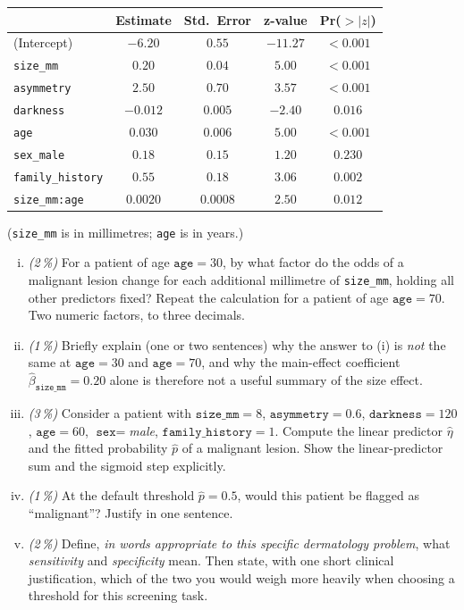 \documentclass[11pt,a4paper]{article}
\newcommand{\subpoints}[1]{\textit{(#1\,\%)}}
\begin{document}
\begin{center}\small
\begin{tabular}{lcccc}
\toprule
 & \textbf{Estimate} & \textbf{Std.\ Error} & \textbf{z-value} & \textbf{Pr($>|z|$)} \\
\midrule
(Intercept)                & $-6.20$  & $0.55$    & $-11.27$ & $<0.001$ \\
\texttt{size\_mm}          & $0.20$   & $0.04$    & $5.00$   & $<0.001$ \\
\texttt{asymmetry}         & $2.50$   & $0.70$    & $3.57$   & $<0.001$ \\
\texttt{darkness}          & $-0.012$ & $0.005$   & $-2.40$  & $0.016$  \\
\texttt{age}               & $0.030$  & $0.006$   & $5.00$   & $<0.001$ \\
\texttt{sex\_male}         & $0.18$   & $0.15$    & $1.20$   & $0.230$  \\
\texttt{family\_history}   & $0.55$   & $0.18$    & $3.06$   & $0.002$  \\
\texttt{size\_mm:age}      & $0.0020$ & $0.0008$  & $2.50$   & $0.012$  \\
\bottomrule
\end{tabular}
\end{center}

(\texttt{size\_mm} is in millimetres; \texttt{age} is in years.)

\begin{enumerate}[(i)]
  \item \subpoints{2} For a patient of age $\texttt{age} = 30$, by what factor do the odds of a malignant lesion change for each additional millimetre of \texttt{size\_mm}, holding all other predictors fixed? Repeat the calculation for a patient of age $\texttt{age} = 70$. Two numeric factors, to three decimals.
  \item \subpoints{1} Briefly explain (one or two sentences) why the answer to (i) is \emph{not} the same at $\texttt{age}=30$ and $\texttt{age}=70$, and why the main-effect coefficient $\hat\beta_{\texttt{size\_mm}} = 0.20$ alone is therefore not a useful summary of the size effect.
  \item \subpoints{3} Consider a patient with $\texttt{size\_mm}=8$, $\texttt{asymmetry}=0.6$, $\texttt{darkness}=120$, $\texttt{age}=60$, $\texttt{sex}=$\emph{male}, $\texttt{family\_history}=1$. Compute the linear predictor $\hat\eta$ and the fitted probability $\hat p$ of a malignant lesion. Show the linear-predictor sum and the sigmoid step explicitly.
  \item \subpoints{1} At the default threshold $\hat p = 0.5$, would this patient be flagged as ``malignant''? Justify in one sentence.
  \item \subpoints{2} Define, \emph{in words appropriate to this specific dermatology problem}, what \emph{sensitivity} and \emph{specificity} mean. Then state, with one short clinical justification, which of the two you would weigh more heavily when choosing a threshold for this screening task.
\end{enumerate}
\end{document}
